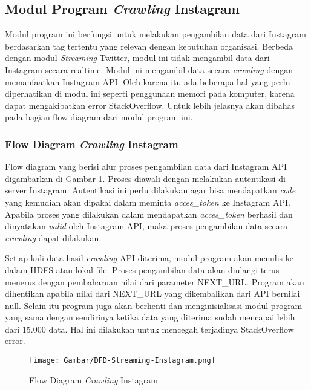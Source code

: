 \subsection{Modul Program \textit{Crawling} Instagram}
Modul program ini berfungsi untuk melakukan pengambilan data dari Instagram berdasarkan tag tertentu yang relevan dengan kebutuhan organisasi. Berbeda dengan modul \textit{Streaming} Twitter, modul ini tidak mengambil data dari Instagram secara realtime. Modul ini mengambil data secara \textit{crawling} dengan memanfaatkan Instagram API. Oleh karena itu ada beberapa hal yang perlu diperhatikan di modul ini seperti penggunaan memori pada komputer, karena dapat mengakibatkan error StackOverflow. Untuk lebih jelasnya akan dibahas pada bagian flow diagram dari modul program ini.

\subsubsection{Flow Diagram \textit{Crawling} Instagram}
\label{sec:dfd_streaming_instagram}
Flow diagram yang berisi alur proses pengambilan data dari Instagram API digambarkan di Gambar \ref{fig:dfd_streaming_instagram}. Proses diawali dengan melakukan autentikasi di server Instagram. Autentikasi ini perlu dilakukan agar bisa mendapatkan \textit{code} yang kemudian akan dipakai dalam meminta \textit{acces\_token} ke Instagram API. Apabila proses yang dilakukan dalam mendapatkan \textit{acces\_token} berhasil dan dinyatakan \textit{valid} oleh Instagram API, maka proses pengambilan data secara \textit{crawling} dapat dilakukan.

Setiap kali data hasil \textit{crawling} API diterima, modul program akan menulis ke dalam HDFS atau lokal file. Proses pengambilan data akan diulangi terus menerus dengan pembaharuan nilai dari parameter NEXT\_URL. Program akan dihentikan apabila nilai dari NEXT\_URL yang dikembalikan dari API bernilai null. Selain itu program juga akan berhenti dan menginisialisasi modul program yang sama dengan sendirinya ketika data yang diterima sudah mencapai lebih dari 15.000 data. Hal ini dilakukan untuk mencegah terjadinya StackOverflow error.

\begin{figure}[H]
	\centering
	\texttt{[image: Gambar/DFD-Streaming-Instagram.png]}
	\caption[Flow Diagram \textit{Crawling} Instagram]{Flow Diagram \textit{Crawling} Instagram} 
	\label{fig:dfd_streaming_instagram}
\end{figure}

